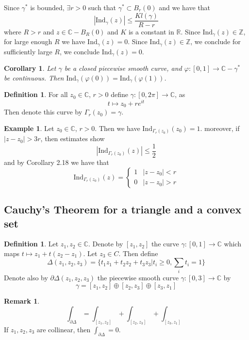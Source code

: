 \documentclass[11pt]{article}
\theoremstyle{plain}
\newtheorem{corollary}[theorem]{Corollary}
\theoremstyle{definition}
\newtheorem{definition}[theorem]{Definition}
\newtheorem{remark}{Remark}
\newtheorem{example}[theorem]{Example}
\newcommand{\C}{\mathbb{C}}
\newcommand{\Ind}{\text{Ind}}
\begin{document}
Since $\gamma^*$ is bounded, $\exists r > 0$ such that $\gamma^* \subset B_r(0)$ and we have that 
$$ |\Ind_{\gamma}(z)| \leq \frac{Kl(\gamma)}{R - r} $$
where $R > r$ and $z \in \C - B_R(0)$ and $K$ is a constant in $\mathbb{R}$. Since $\Ind_{\gamma}(z) \in \mathbb{Z}$, for large enough $R$ we have $\Ind_{\gamma}(z) = 0$. Since $\Ind_{\gamma}(z) \in \mathbb{Z}$, we conclude for sufficiently large $R$, we conclude $\Ind_{\gamma}(z) = 0 $.

\begin{corollary}
Let $\gamma$ be a closed piecewise smooth curve, and $\varphi:[0, 1] \to \C - \gamma^*$ be continuous. Then $\Ind_{\gamma}(\varphi(0)) = \Ind_{\gamma}(\varphi(1))$.
\end{corollary}

\begin{definition}
For all $z_0 \in \C$, $r>0$ define $\gamma:[0, 2\pi] \to \mathbb{C}$, as 
$$ t \mapsto z_0 + re^{it} $$
Then denote this curve by $\Gamma_r(z_0) = \gamma$.
\end{definition}

\begin{example}
Let $z_0 \in \C$, $r > 0$. Then we have $\Ind_{\Gamma_r(z_0)}(z_0) = 1$. moreover, if $|z - z_0| > 3r$, then estimates show 
$$ |\Ind_{\Gamma_r(z_0)}(z)| \leq \frac{1}{2} $$
and by Corollary 2.18 we have that 
$$ \Ind_{\Gamma_r(z_0)}(z) = \begin{cases} 1 & |z - z_0| < r \\ 0 & |z - z_0| > r \end{cases} $$
\end{example}

\subsection{Cauchy's Theorem for a triangle and a convex set}
\begin{definition} 
Let $z_1, z_2 \in \C$. Denote by $[z_1, z_2]$ the curve $\gamma:[0, 1] \to \C$ which maps $t \mapsto z_1 + t(z_2 - z_1)$. Let $z_3 \in C$. Then define 
$$ \Delta(z_1, z_2, z_3) = \{ t_1z_1 + t_2z_2 + t_3z_3 | t_i \geq 0, \sum_i t_i = 1\} $$
Denote also by $\partial \Delta(z_1, z_2, z_3)$ the piecewise smooth curve $\gamma:[0,3] \to \C$ by 
$$ \gamma = [z_1, z_2] \oplus [z_2, z_3] \oplus [z_3, z_1] $$
\end{definition}

\begin{remark}
$$ \int_{\partial\Delta} = \int_{[z_1, z_2]} + \int_{[z_2, z_3]} + \int_{[z_3, z_1]} $$
If $z_1, z_2, z_3$ are collinear, then $\int_{\partial\Delta} = 0$.
\end{remark}
\end{document}

